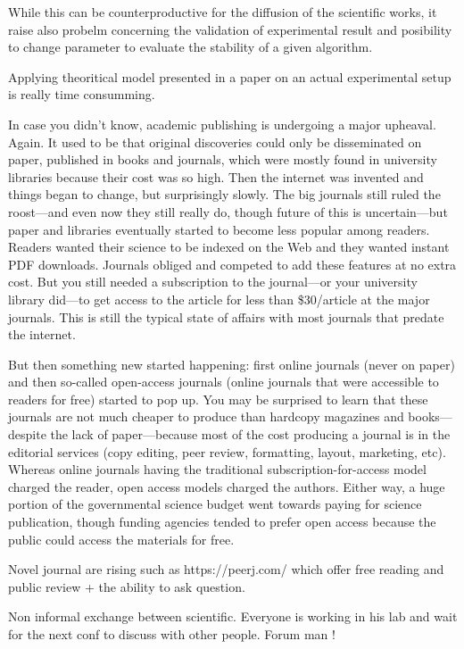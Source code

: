 While this can be counterproductive for the diffusion of the scientific works, it raise also probelm concerning the validation of experimental result and posibility to change parameter to evaluate the stability of a given algorithm.

Applying theoritical model presented in a paper on an actual experimental setup is really time consumming.

In case you didn’t know, academic publishing is undergoing a major upheaval.
Again.
It used to be that original discoveries could only be disseminated on paper, published in books and journals, which were mostly found in university libraries because their cost was so high.
Then the internet was invented and things began to change, but surprisingly slowly.
The big journals still ruled the roost—and even now they still really do, though future of this is uncertain—but paper and libraries eventually started to become less popular among readers.
Readers wanted their science to be indexed on the Web and they wanted instant PDF downloads.
Journals obliged and competed to add these features at no extra cost.
But you still needed a subscription to the journal—or your university library did—to get access to the article for less than \$30/article at the major journals.
This is still the typical state of affairs with most journals that predate the internet.

But then something new started happening: first online journals (never on paper) and then so-called open-access journals (online journals that were accessible to readers for free) started to pop up.
You may be surprised to learn that these journals are not much cheaper to produce than hardcopy magazines and books—despite the lack of paper—because most of the cost producing a journal is in the editorial services (copy editing, peer review, formatting, layout, marketing, etc).
Whereas online journals having the traditional subscription-for-access model charged the reader, open access models charged the authors.
Either way, a huge portion of the governmental science budget went towards paying for science publication, though funding agencies tended to prefer open access because the public could access the materials for free.

Novel journal are rising such as https://peerj.com/ which offer free reading and public review + the ability to ask question.

Non informal exchange between scientific.
Everyone is working in his lab and wait for the next conf to discuss with other people.
Forum man !

